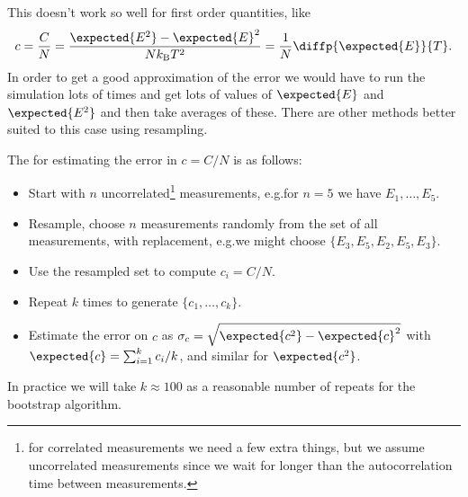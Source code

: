 \documentclass[fleqn]{NotesClass}
\newcommand*{\boltzmann}{k_{\mathrm{B}}}
\begin{document}
    This doesn't work so well for first order quantities, like
    \begin{equation}
        c = \frac{C}{N} = \frac{\expected{E^2} - \expected{E}^2}{N\boltzmann T^2} = \frac{1}{N} \diffp{\expected{E}}{T}.
    \end{equation}
    In order to get a good approximation of the error we would have to run the simulation lots of times and get lots of values of \(\expected{E}\) and \(\expected{E^2}\) and then take averages of these.
    There are other methods better suited to this case using resampling.
    
    The  for estimating the error in \(c = C/N\) is as follows:
    \begin{itemize}
        \item Start with \(n\) uncorrelated\footnote{for correlated measurements we need a few extra things, but we assume uncorrelated measurements since we wait for longer than the autocorrelation time between measurements.} measurements, e.g.\@ for \(n = 5\) we have \(E_1, \dotsc, E_5\).
        \item Resample, choose \(n\) measurements randomly from the set of all measurements, with replacement, e.g.\@ we might choose \(\{E_3, E_5, E_2, E_5, E_3\}\).
        \item Use the resampled set to compute \(c_i = C/N\).
        \item Repeat \(k\) times to generate \(\{c_1, \dotsc, c_k\}\).
        \item Estimate the error on \(c\) as \(\sigma_c = \sqrt{\expected{c^2} - \expected{c}^2}\) with \(\expected{c} = \sum_{i = 1}^k c_i / k\), and similar for \(\expected{c^2}\).
    \end{itemize}
    In practice we will take \(k \approx 100\) as a reasonable number of repeats for the bootstrap algorithm.
    
\end{document}
